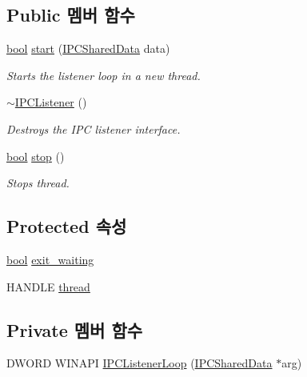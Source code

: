 \subsection*{Public 멤버 함수}
\begin{DoxyCompactItemize}
\item 
\hyperlink{avb__gptp_8h_af6a258d8f3ee5206d682d799316314b1}{bool} \hyperlink{class_i_p_c_listener_ad040984cedd269133c991f17be8808fc}{start} (\hyperlink{class_i_p_c_shared_data}{I\+P\+C\+Shared\+Data} data)
\begin{DoxyCompactList}\small\item\em Starts the listener loop in a new thread. \end{DoxyCompactList}\item 
\hyperlink{class_i_p_c_listener_acfa0b4a5593a47073f27b94016382d63}{$\sim$\+I\+P\+C\+Listener} ()
\begin{DoxyCompactList}\small\item\em Destroys the I\+PC listener interface. \end{DoxyCompactList}\item 
\hyperlink{avb__gptp_8h_af6a258d8f3ee5206d682d799316314b1}{bool} \hyperlink{class_stoppable_a68a350717fe6bf9012843e7c977d87b2}{stop} ()
\begin{DoxyCompactList}\small\item\em Stops thread. \end{DoxyCompactList}\end{DoxyCompactItemize}
\subsection*{Protected 속성}
\begin{DoxyCompactItemize}
\item 
\hyperlink{avb__gptp_8h_af6a258d8f3ee5206d682d799316314b1}{bool} \hyperlink{class_stoppable_ae0c3c0996c39797d309663cd3a2633d3}{exit\+\_\+waiting}
\item 
H\+A\+N\+D\+LE \hyperlink{class_stoppable_adf8b62c27edd1f6b7641bb7bb7f60275}{thread}
\end{DoxyCompactItemize}
\subsection*{Private 멤버 함수}
\begin{DoxyCompactItemize}
\item 
D\+W\+O\+RD W\+I\+N\+A\+PI \hyperlink{class_i_p_c_listener_a5a355dec31c967a46b8ce6209cea9927}{I\+P\+C\+Listener\+Loop} (\hyperlink{class_i_p_c_shared_data}{I\+P\+C\+Shared\+Data} $\ast$arg)
\end{DoxyCompactItemize}
